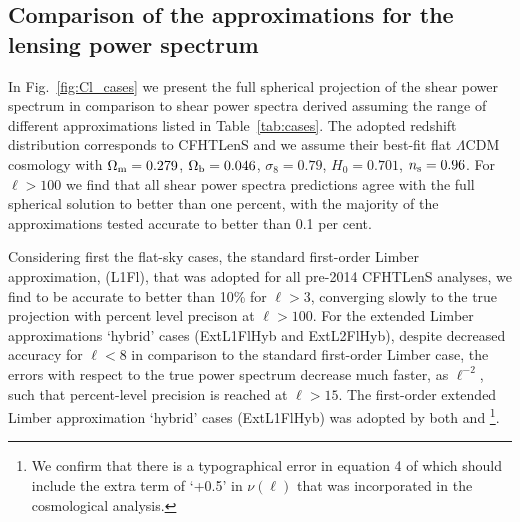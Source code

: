 \documentclass[fleqn,usenatbib]{mnras} %
\begin{document}
\subsection{Comparison of the approximations for the lensing power spectrum}
\label{sec:comp}


In Fig.~\ref{fig:Cl_cases} we present the full spherical projection of the shear power spectrum in comparison to shear power spectra derived assuming
the range of different approximations listed in Table~\ref{tab:cases}.  The adopted redshift distribution corresponds to CFHTLenS
\cite{CFHTLenS-2pt-notomo} and we assume their best-fit flat $\Lambda$CDM cosmology with $\Omega_{\rm m}=0.279$, $\Omega_{\rm b}=0.046$, $\sigma_8=0.79$, $H_0=0.701$, $n_{\rm s}=0.96$. 
For $\ell > 100$ we find that all shear power spectra predictions agree with the full spherical solution to better than one percent, with the majority of the approximations tested accurate to better than 0.1 per cent.   

Considering first the flat-sky cases, the standard first-order Limber approximation, (L1Fl), that was adopted for all pre-2014 CFHTLenS analyses, we find to be 
accurate to better than 10\% for $\ell>3$, converging slowly to the true projection with percent level precison at $\ell>100$. 
For the extended Limber approximations `hybrid' cases (ExtL1FlHyb and ExtL2FlHyb), despite decreased accuracy
for $\ell < 8$ in comparison to the standard first-order Limber case, the errors with respect to
the true power spectrum decrease much faster, as $\ell^{-2}$, such that percent-level precision is reached at $\ell>15$.  The first-order extended Limber approximation `hybrid' cases (ExtL1FlHyb) was adopted by both \citet{joudaki/etal:2016} and \cite{KiDS-450}\footnote{We confirm that there is a typographical error in equation 4 of \cite{KiDS-450} which should include the extra term of `+0.5' in $\nu(\ell)$ that was incorporated in the cosmological analysis.}. 
\end{document}

